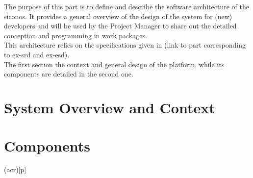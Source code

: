 \documentclass[a4paper,twoside,openright,makeidx,12pt]{book}
\begin{document}
\pagestyle{empty}
\renewcommand{\arraystretch}{1.8}
\tableofcontents
\pagestyle{fancy}
\cleardoublepage
{}
The purpose of this part is to define and describe the software architecture of the \ac{siconos}. It provides a 
general overview of the design of the system for (new) developers and will be used by the Project Manager to share out 
the detailed conception and programming in work packages. \\
This architecture relies on the specifications given in (link to part corresponding to ex-srd and ex-esd). \\
The first section the context and general design of the platform, while its components are detailed in the second
one. 
\section{System Overview and Context}
\label{Sec:ADD-SystemOverviewAndContext}

\newpage
\section{Components}
\label{Sec:ADD-Components}

\printglosstex(acr)[p]
\listoffigures
\cleardoublepage
\end{document}
